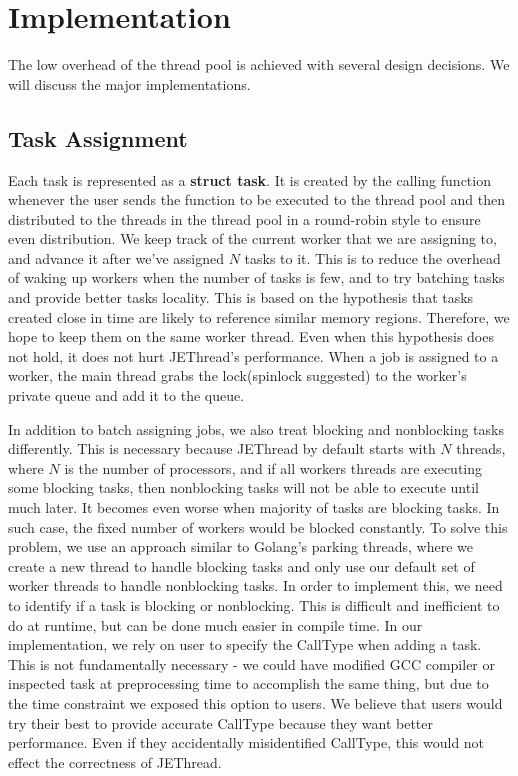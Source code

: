 \documentclass[journal, a4paper]{IEEEtran}
\begin{document}
\section{Implementation}
The low overhead of the thread pool is achieved with several design decisions. We will discuss the major implementations. 
\subsection{Task Assignment}
Each task is represented as a \textbf{struct task}. It is created by the calling function whenever the user sends the function to be executed to the thread pool and then distributed to the threads in the thread pool in a round-robin style to ensure even distribution. We keep track of the current worker that we are assigning to, and advance it after we've assigned $N$ tasks to it. This is to reduce the overhead of waking up workers when the number of tasks is few, and to try batching tasks and provide better tasks locality. This is based on the hypothesis that tasks created close in time are likely to reference similar memory regions. Therefore, we hope to keep them on the same worker thread. Even when this hypothesis does not hold, it does not hurt JEThread's performance. When a job is assigned to a worker, the main thread grabs the lock(spinlock suggested) to the worker's private queue and add it to the queue.

In addition to batch assigning jobs, we also treat blocking and nonblocking tasks differently. This is necessary because JEThread by default starts with $N$ threads, where $N$ is the number of processors, and if all workers threads are executing some blocking tasks, then nonblocking tasks will not be able to execute until much later. It becomes even worse when majority of tasks are blocking tasks. In such case, the fixed number of workers would be blocked constantly. To solve this problem, we use an approach similar to Golang's parking threads, where we create a new thread to handle blocking tasks and only use our default set of worker threads to handle nonblocking tasks. In order to implement this, we need to identify if a task is blocking or nonblocking. This is difficult and inefficient to do at runtime, but can be done much easier in compile time. In our implementation, we rely on user to specify the CallType when adding a task. This is not fundamentally necessary - we could have modified GCC compiler or inspected task at preprocessing time to accomplish the same thing, but due to the time constraint we exposed this option to users. We believe that users would try their best to provide accurate CallType because they want better performance. Even if they accidentally misidentified CallType, this would not effect the correctness of JEThread.
\end{document}
